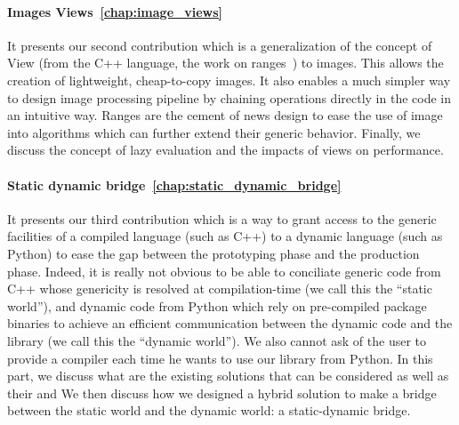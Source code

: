 \paragraph{Images Views~\ref{chap:image_views}} It presents our second contribution which is a generalization of the
concept of View (from the C++ language, the work on ranges~\parencite{niebler.2018.ranges}) to images. This allows the
creation of lightweight, cheap-to-copy images. It also enables a much simpler way to design image processing pipeline by
chaining operations directly in the code in an intuitive way. Ranges are the cement of news design to ease the use of
image into algorithms which can further extend their generic behavior. Finally, we discuss the concept of lazy
evaluation and the impacts of views on performance.

\paragraph{Static dynamic bridge~\ref{chap:static_dynamic_bridge}} It presents our third contribution which is a way to
grant access to the generic facilities of a compiled language (such as C++) to a dynamic language (such as Python) to
ease the gap between the prototyping phase and the production phase. Indeed, it is really not obvious to be able to
conciliate generic code from C++ whose genericity is resolved at compilation-time (we call this the ``static world''),
and dynamic code from Python which rely on pre-compiled package binaries to achieve an efficient communication between
the dynamic code and the library (we call this the ``dynamic world''). We also cannot ask of the user to provide a
compiler each time he wants to use our library from Python. In this part, we discuss what are the existing solutions
that can be considered as well as their \pros and \cons We then discuss how we designed a hybrid solution to make a
bridge between the static world and the dynamic world: a static-dynamic bridge.
